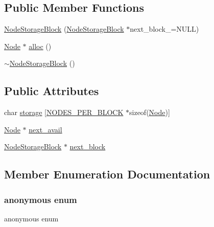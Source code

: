\subsection*{Public Member Functions}
\begin{DoxyCompactItemize}
\item 
\hyperlink{structtrimesh_1_1KDtree_1_1NodeStorageBlock_aa55acd82ca99ee62cb9cba7d2ab388f0}{Node\+Storage\+Block} (\hyperlink{structtrimesh_1_1KDtree_1_1NodeStorageBlock}{Node\+Storage\+Block} $\ast$next\+\_\+block\+\_\+=N\+U\+LL)
\item 
\hyperlink{structtrimesh_1_1KDtree_1_1Node}{Node} $\ast$ \hyperlink{structtrimesh_1_1KDtree_1_1NodeStorageBlock_aa83641f8f90fd796f7c67191cd69b1c3}{alloc} ()
\item 
\hyperlink{structtrimesh_1_1KDtree_1_1NodeStorageBlock_aa0bf346b84fbe08bc70a097d160a0c79}{$\sim$\+Node\+Storage\+Block} ()
\end{DoxyCompactItemize}
\subsection*{Public Attributes}
\begin{DoxyCompactItemize}
\item 
char \hyperlink{structtrimesh_1_1KDtree_1_1NodeStorageBlock_a0958126dfe8d25e2f58c8f03f45869a0}{storage} \mbox{[}\hyperlink{structtrimesh_1_1KDtree_1_1NodeStorageBlock_a53a3d1f98196691515bfb4c974102336abed02221dc8cfae72d1a32f807c5316f}{N\+O\+D\+E\+S\+\_\+\+P\+E\+R\+\_\+\+B\+L\+O\+CK} $\ast$sizeof(\hyperlink{structtrimesh_1_1KDtree_1_1Node}{Node})\mbox{]}
\item 
\hyperlink{structtrimesh_1_1KDtree_1_1Node}{Node} $\ast$ \hyperlink{structtrimesh_1_1KDtree_1_1NodeStorageBlock_a31661d8155b48fafa14aa6f066ffc5eb}{next\+\_\+avail}
\item 
\hyperlink{structtrimesh_1_1KDtree_1_1NodeStorageBlock}{Node\+Storage\+Block} $\ast$ \hyperlink{structtrimesh_1_1KDtree_1_1NodeStorageBlock_aeb244f2daeda3453d676b40c7de5c3ad}{next\+\_\+block}
\end{DoxyCompactItemize}


\subsection{Member Enumeration Documentation}
\mbox{\label{structtrimesh_1_1KDtree_1_1NodeStorageBlock_a53a3d1f98196691515bfb4c974102336}} 
\subsubsection{\texorpdfstring{anonymous enum}{anonymous enum}}
{\footnotesize\ttfamily anonymous enum}

